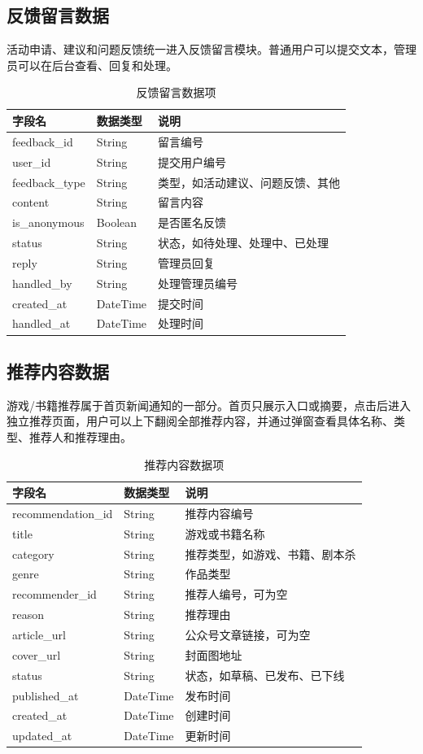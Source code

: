 \documentclass[a4paper,12pt]{article}
\begin{document}
\subsection{反馈留言数据}

活动申请、建议和问题反馈统一进入反馈留言模块。普通用户可以提交文本，管理员可以在后台查看、回复和处理。

\begin{longtable}{p{3.5cm}p{3cm}p{7cm}}
\caption{反馈留言数据项} \\
\toprule
字段名 & 数据类型 & 说明 \\
\midrule
feedback\_id & String & 留言编号 \\
user\_id & String & 提交用户编号 \\
feedback\_type & String & 类型，如活动建议、问题反馈、其他 \\
content & String & 留言内容 \\
is\_anonymous & Boolean & 是否匿名反馈 \\
status & String & 状态，如待处理、处理中、已处理 \\
reply & String & 管理员回复 \\
handled\_by & String & 处理管理员编号 \\
created\_at & DateTime & 提交时间 \\
handled\_at & DateTime & 处理时间 \\
\bottomrule
\end{longtable}

\subsection{推荐内容数据}

游戏/书籍推荐属于首页新闻通知的一部分。首页只展示入口或摘要，点击后进入独立推荐页面，用户可以上下翻阅全部推荐内容，并通过弹窗查看具体名称、类型、推荐人和推荐理由。

\begin{longtable}{p{3.5cm}p{3cm}p{7cm}}
\caption{推荐内容数据项} \\
\toprule
字段名 & 数据类型 & 说明 \\
\midrule
recommendation\_id & String & 推荐内容编号 \\
title & String & 游戏或书籍名称 \\
category & String & 推荐类型，如游戏、书籍、剧本杀 \\
genre & String & 作品类型 \\
recommender\_id & String & 推荐人编号，可为空 \\
reason & String & 推荐理由 \\
article\_url & String & 公众号文章链接，可为空 \\
cover\_url & String & 封面图地址 \\
status & String & 状态，如草稿、已发布、已下线 \\
published\_at & DateTime & 发布时间 \\
created\_at & DateTime & 创建时间 \\
updated\_at & DateTime & 更新时间 \\
\bottomrule
\end{longtable}
\end{document}

